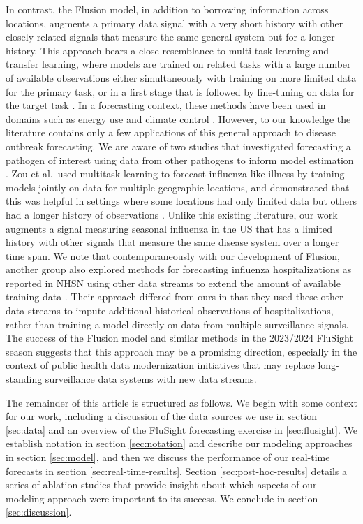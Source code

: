 \documentclass{article}\usepackage[]{graphicx}\usepackage[]{xcolor}
\begin{document}
In contrast, the Flusion model, in addition to borrowing information across locations, augments a primary data signal with a very short history with other closely related signals that measure the same general system but for a longer history. 
This approach bears a close resemblance to multi-task learning and transfer learning, where models are trained on related tasks with a large number of available observations either simultaneously with training on more limited data for the primary task, or in a first stage that is followed by fine-tuning on data for the target task \cite{pan2009surveytransfer}.
In a forecasting context, these methods have been used in domains such as energy use and climate control \cite{Ribeiro2018transferbuildingenergy, Grubinger2017transferclimatecontrol}.
However, to our knowledge the literature contains only a few applications of this general approach to disease outbreak forecasting.  We are aware of two studies that investigated forecasting a pathogen of interest using data from other pathogens to inform model estimation \cite{Roster2022transfernewdiseases,Coelho2020transfermoquitoborne}. Zou et al.\ used multitask learning to forecast influenza-like illness by training models jointly on data for multiple geographic locations, and demonstrated that this was helpful in settings where some locations had only limited data but others had a longer history of observations \cite{zou2018multitaskILI}.
Unlike this existing literature, our work augments a signal measuring seasonal influenza in the US that has a limited history with other signals that measure the same disease system over a longer time span.
We note that contemporaneously with our development of Flusion, another group also explored methods for forecasting influenza hospitalizations as reported in NHSN using other data streams to extend the amount of available training data \cite{Meyer2024flutransfer}. Their approach differed from ours in that they used these other data streams to impute additional historical observations of hospitalizations, rather than training a model directly on data from multiple surveillance signals.
The success of the Flusion model and similar methods in the 2023/2024 FluSight season suggests that this approach may be a promising direction, especially in the context of public health data modernization initiatives that may replace long-standing surveillance data systems with new data streams.

The remainder of this article is structured as follows. We begin with some context for our work, including a discussion of the data sources we use in section \ref{sec:data} and an overview of the FluSight forecasting exercise in \ref{sec:flusight}. We establish notation in section \ref{sec:notation} and describe our modeling approaches in section \ref{sec:model}, and then we discuss the performance of our real-time forecasts in section \ref{sec:real-time-results}. Section \ref{sec:post-hoc-results} details a series of ablation studies that provide insight about which aspects of our modeling approach were important to its success. We conclude in section \ref{sec:discussion}.
\end{document}
